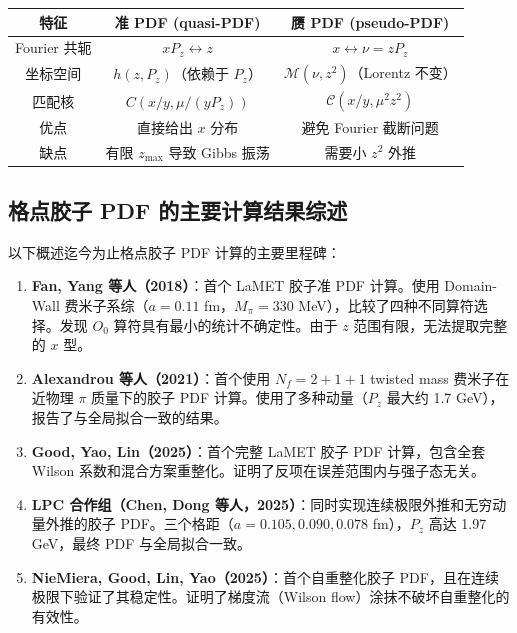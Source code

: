 \documentclass[11pt,a4paper]{ctexart}
\begin{document}
\begin{center}
\begin{tabular}{c c c}
\toprule
\textbf{特征} & \textbf{准 PDF (quasi-PDF)} & \textbf{赝 PDF (pseudo-PDF)} \\
\midrule
Fourier 共轭 & $xP_z \leftrightarrow z$ & $x \leftrightarrow \nu = zP_z$ \\
坐标空间 & $h(z, P_z)$（依赖于 $P_z$） & $\mathcal{M}(\nu, z^2)$（Lorentz 不变） \\
匹配核 & $C(x/y, \mu/(yP_z))$ & $\mathcal{C}(x/y, \mu^2 z^2)$ \\
优点 & 直接给出 $x$ 分布 & 避免 Fourier 截断问题 \\
缺点 & 有限 $z_{\text{max}}$ 导致 Gibbs 振荡 & 需要小 $z^2$ 外推 \\
\bottomrule
\end{tabular}
\end{center}

\subsection{格点胶子 PDF 的主要计算结果综述}

以下概述迄今为止格点胶子 PDF 计算的主要里程碑：

\begin{enumerate}
  \item \textbf{Fan, Yang 等人（2018）}：首个 LaMET 胶子准 PDF 计算。使用 Domain-Wall 费米子系综（$a=0.11$ fm，$M_\pi=330$ MeV），比较了四种不同算符选择。发现 $O_0$ 算符具有最小的统计不确定性。由于 $z$ 范围有限，无法提取完整的 $x$ 型。

  \item \textbf{Alexandrou 等人（2021）}：首个使用 $N_f=2+1+1$ twisted mass 费米子在近物理 $\pi$ 质量下的胶子 PDF 计算。使用了多种动量（$P_z$ 最大约 1.7 GeV），报告了与全局拟合一致的结果。

  \item \textbf{Good, Yao, Lin（2025）}：首个完整 LaMET 胶子 PDF 计算，包含全套 Wilson 系数和混合方案重整化。证明了反项在误差范围内与强子态无关。

  \item \textbf{LPC 合作组（Chen, Dong 等人，2025）}：同时实现连续极限外推和无穷动量外推的胶子 PDF。三个格距（$a=0.105, 0.090, 0.078$ fm），$P_z$ 高达 1.97 GeV，最终 PDF 与全局拟合一致。

  \item \textbf{NieMiera, Good, Lin, Yao（2025）}：首个自重整化胶子 PDF，且在连续极限下验证了其稳定性。证明了梯度流（Wilson flow）涂抹不破坏自重整化的有效性。
\end{enumerate}
\end{document}
